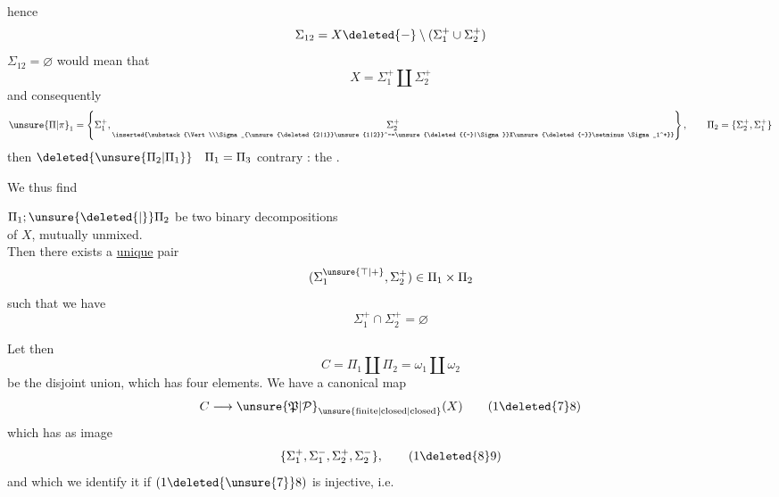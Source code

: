 hence
\[
\Sigma_{12}=X\deleted{-}\setminus(\Sigma_1^+\cup\Sigma_2^+)
\]
 $\Sigma_{12}=\varnothing$ would mean that
\[
X=\Sigma_1^+\amalg\Sigma_2^+
\]
and consequently
\[
\unsure{\Pi|\pi}_1=\left\{\Sigma_1^+,\underset{\inserted{\substack{\Vert\\\Sigma_{\unsure{\deleted{2|1}}\unsure{1|2}}^-=\unsure{\deleted{{-}|\Sigma}}X\unsure{\deleted{-}}\setminus\Sigma_1^+}}}{\Sigma_2^+}\right\},
\qquad\Pi_2=\{\Sigma_2^+,\Sigma_1^+\}
\]
then $\deleted{\unsure{\Pi_2|\Pi_1}}\quad\Pi_1=\Pi_3$ contrary : the .

We thus find

\noindent{}   $\Pi_1;\unsure{\deleted{\vert}}\Pi_2$ be two binary decompositions\\
\makebox[0pt][r]{\rule[-2.7ex]{.4pt}{3.8ex}\hspace{.45em}}of $X$, mutually unmixed.\\
Then there exists a \uline{unique} pair
\[
(\Sigma_1^{\unsure{\top|+}},\Sigma_2^+)\in\Pi_1\times\Pi_2
\]
\noindent\makebox[0pt][r]{\rule[-.35ex]{.4pt}{2ex}\hspace{.45em}}such that we have
\[
\Sigma_1^+\cap\Sigma_2^+=\varnothing
\]

\begingroup\makeatletter\tagsleft@true\makeatother
Let then
\[
C=\Pi_1\amalg\Pi_2=\omega_1\amalg\omega_2
\tag*{(17)}
\]
be the disjoint union, which has four elements. We have a canonical map
\[
C\longrightarrow{\unsure{\mathfrak{P}|\mathcal{P}}}_{\unsure{\text{finite}|\text{closed}|\text{closed}}}(X)
\tag*{(1\deleted{7}8)}
\]
which has as image
\[
\{\Sigma_1^+,\Sigma_1^-,\Sigma_2^+,\Sigma_2^-\},
\tag*{(1\deleted{8}9)}
\]
and which we identify it if $(1\deleted{\unsure{7}}8)$ is injective, i.e.
\endgroup
\clearpage
